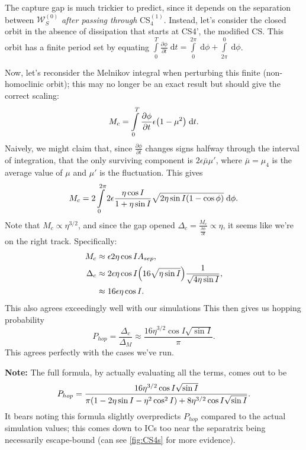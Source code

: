 \documentclass[11pt,
        usenames, %
        dvipsnames %
    ]{article}
\newcommand*{\pd}[2]{\frac{\partial#1}{\partial#2}}
\DeclarePairedDelimiter\p{\lparen}{\rparen}
\begin{document}
The capture gap is much trickier to predict, since it depends on the separation
between $\mathcal{W}^{(0)}_S$ \emph{after passing through} CS$_4^{(1)}$.
Instead, let's consider the closed orbit in the absence of dissipation that
starts at CS4', the modified CS\@. This orbit has a finite period set by
equating $\int\limits_0^T \pd{\phi}{t}\;\mathrm{d}t =
\int\limits_0^{2\pi}\;\mathrm{d}\phi + \int\limits_{2\pi}^0\;\mathrm{d}\phi$.

Now, let's reconsider the Melnikov integral when perturbing this finite
(non-homoclinic orbit); this may no longer be an exact result but should give
the correct scaling:
\begin{equation}
    M_c = \int\limits_0^T \pd{\phi}{t}\epsilon \p*{1 - \mu^2}\;\mathrm{d}t.
\end{equation}
Naively, we might claim that, since $\pd{\phi}{t}$ changes signs halfway through
the interval of integration, that the only surviving component is $2\epsilon
\bar{\mu}\mu'$, where $\bar{\mu} = \mu_4$ is the average value of $\mu$ and
$\mu'$ is the fluctuation. This gives
\begin{equation}
    M_c = 2\int\limits_0^{2\pi}2\epsilon \frac{\eta \cos I}{1 + \eta \sin I}
        \sqrt{2\eta \sin I \p*{1 - \cos \phi}}\;\mathrm{d}\phi.
\end{equation}
Note that $M_c \propto \eta^{3/2}$, and since the gap opened $\Delta_c =
\frac{M_c}{\pd{\phi}{t}} \propto \eta$, it seems like we're on the right track.
Specifically:
\begin{align}
    M_c &\approx \epsilon 2\eta \cos I A_{sep},\\
    \Delta_c &\approx 2\epsilon \eta \cos I \p*{16 \sqrt{\eta \sin I}}
        \frac{1}{\sqrt{4\eta \sin I}},\\
        &\approx 16\epsilon \eta \cos I.
\end{align}
This also agrees exceedingly well with our simulations This then gives us
hopping probability
\begin{equation}
    P_{hop} = \frac{\Delta_c}{\Delta_M} \approx
        \frac{16\eta^{3/2}\cos I \sqrt{\sin I}}{\pi}.
\end{equation}
This agrees perfectly with the cases we've run.

\textbf{Note:} The full formula, by actually evaluating all the terms, comes out
to be
\begin{equation}
    P_{hop} = \frac{16\eta^{3/2}\cos I \sqrt{\sin I}}{\pi
        \p{1 - 2\eta \sin I - \eta^2 \cos^2 I}
        + 8\eta^{3/2}\cos I \sqrt{\sin I}}.
\end{equation}
It bears noting this formula slightly overpredicts $P_{hop}$ compared to the
actual simulation values; this comes down to ICs too near the separatrix being
necessarily escape-bound (can see \autoref{fig:CS4s} for more evidence).
\end{document}
